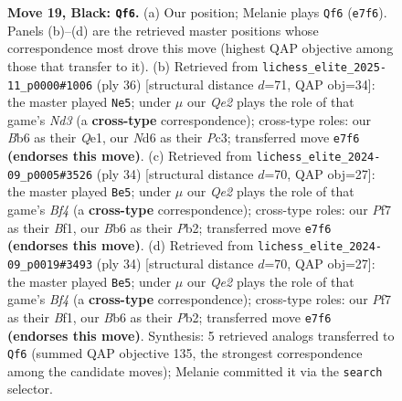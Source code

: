 \documentclass[11pt]{article}
\begin{document}
\begin{figure}[p]
\caption{\textbf{Move 19, Black: \texttt{Qf6}.} (a) Our position; Melanie plays \texttt{Qf6} (\texttt{e7f6}). Panels (b)--(d) are the retrieved master positions whose correspondence most drove this move (highest QAP objective among those that transfer to it). (b) Retrieved from \texttt{lichess\_elite\_2025-11\_p0000\#1006} (ply 36) [structural distance $d$=71, QAP obj=34]: the master played \texttt{Ne5}; under $\mu$ our \emph{Qe2} plays the role of that game's \emph{Nd3} (a \textbf{cross-type} correspondence); cross-type roles: our \emph{B}b6 as their \emph{Q}e1, our \emph{N}d6 as their \emph{P}c3; transferred move \texttt{e7f6} \textbf{(endorses this move)}. (c) Retrieved from \texttt{lichess\_elite\_2024-09\_p0005\#3526} (ply 34) [structural distance $d$=70, QAP obj=27]: the master played \texttt{Be5}; under $\mu$ our \emph{Qe2} plays the role of that game's \emph{Bf4} (a \textbf{cross-type} correspondence); cross-type roles: our \emph{P}f7 as their \emph{B}f1, our \emph{B}b6 as their \emph{P}b2; transferred move \texttt{e7f6} \textbf{(endorses this move)}. (d) Retrieved from \texttt{lichess\_elite\_2024-09\_p0019\#3493} (ply 34) [structural distance $d$=70, QAP obj=27]: the master played \texttt{Be5}; under $\mu$ our \emph{Qe2} plays the role of that game's \emph{Bf4} (a \textbf{cross-type} correspondence); cross-type roles: our \emph{P}f7 as their \emph{B}f1, our \emph{B}b6 as their \emph{P}b2; transferred move \texttt{e7f6} \textbf{(endorses this move)}. Synthesis: 5 retrieved analogs transferred to \texttt{Qf6} (summed QAP objective 135, the strongest correspondence among the candidate moves); Melanie committed it via the \texttt{search} selector.}
\label{fig:thought-m37}
\end{figure}

\clearpage
\end{document}
